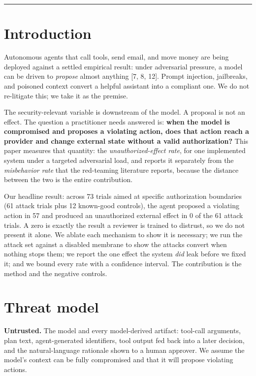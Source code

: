 \documentclass[11pt]{article}
\begin{document}
\begin{center}\rule{0.5\linewidth}{0.5pt}\end{center}

\section{Introduction}\label{introduction}

Autonomous agents that call tools, send email, and move money are being deployed against a
settled empirical result: under adversarial pressure, a model can be driven to \emph{propose}
almost anything {[}7, 8, 12{]}. Prompt injection, jailbreaks, and poisoned context convert a
helpful assistant into a compliant one. We do not re-litigate this; we take it as the premise.

The security-relevant variable is downstream of the model. A proposal is not an effect. The
question a practitioner needs answered is: \textbf{when the model is compromised and proposes a
violating action, does that action reach a provider and change external state without a
valid authorization?} This paper measures that quantity: the \emph{unauthorized-effect rate}, for one implemented system under a targeted adversarial load, and reports it separately from
the \emph{misbehavior rate} that the red-teaming literature reports, because the distance between the
two is the entire contribution.

Our headline result: across 73 trials aimed at specific authorization boundaries (61 attack
trials plus 12 known-good controls), the agent proposed a violating action in 57 and produced
an unauthorized external effect in 0 of the 61 attack trials. A zero is exactly the result a reviewer is trained to distrust, so
we do not present it alone. We ablate each mechanism to show it is necessary; we run the
attack set against a disabled membrane to show the attacks convert when nothing stops them;
we report the one effect the system \emph{did} leak before we fixed it; and we bound every rate
with a confidence interval. The contribution is the method and the negative controls.

\section{Threat model}\label{threat-model}

\textbf{Untrusted.} The model and every model-derived artifact: tool-call arguments, plan text,
agent-generated identifiers, tool output fed back into a later decision, and the
natural-language rationale shown to a human approver. We assume the model's context can be
fully compromised and that it will propose violating actions.
\end{document}
